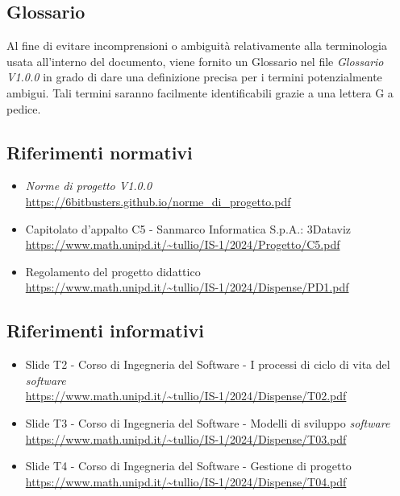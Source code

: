 \subsection{Glossario}
Al fine di evitare incomprensioni o ambiguità relativamente alla terminologia
usata all'interno del documento, viene fornito un Glossario nel file
\textit{Glossario V1.0.0} in grado di dare una definizione precisa per i
termini potenzialmente ambigui. Tali termini saranno facilmente identificabili
grazie a una lettera G a pedice.
\subsection{Riferimenti normativi}
\begin{itemize}
      \item \textit{Norme di progetto V1.0.0} \\ \url{https://6bitbusters.github.io/norme_di_progetto.pdf}
      \item Capitolato d'appalto C5 - Sanmarco Informatica S.p.A.: 3Dataviz \\ \url{https://www.math.unipd.it/~tullio/IS-1/2024/Progetto/C5.pdf}
      \item Regolamento del progetto didattico \\ \url{https://www.math.unipd.it/~tullio/IS-1/2024/Dispense/PD1.pdf}
\end{itemize}
\subsection{Riferimenti informativi}
\begin{itemize}
      \item Slide T2 - Corso di Ingegneria del Software - I processi di ciclo di vita del \textit{software} \\ \url{https://www.math.unipd.it/~tullio/IS-1/2024/Dispense/T02.pdf}
      \item Slide T3 - Corso di Ingegneria del Software - Modelli di sviluppo \textit{software} \\ \url{https://www.math.unipd.it/~tullio/IS-1/2024/Dispense/T03.pdf}
      \item Slide T4 - Corso di Ingegneria del Software - Gestione di progetto \\ \url{https://www.math.unipd.it/~tullio/IS-1/2024/Dispense/T04.pdf}
\end{itemize}
